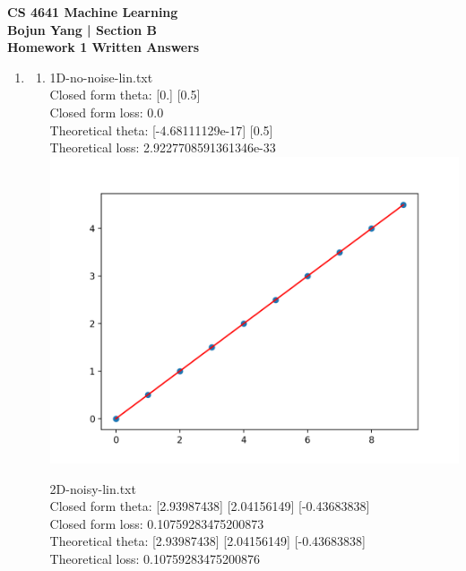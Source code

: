 \documentclass[12pt]{article}
\newcommand{\nextproblem}{
	\vfill
	\pagebreak
}
\begin{document}
	\begin{center}
			\textbf{CS 4641 Machine Learning} \vspace*{2mm}
			\textbf{\\ Bojun Yang | Section B} \vspace*{2mm}
			\textbf{\\ Homework 1 Written Answers }
	\end{center}
	\vspace*{2mm}


\begin{enumerate}

\item
\begin{enumerate}
	\item 1D-no-noise-lin.txt
	\\ Closed form theta: [0.] [0.5]
	\\ Closed form loss: 0.0
	\\ Theoretical theta: [-4.68111129e-17] [0.5]
	\\ Theoretical loss: 2.9227708591361346e-33 
	\\ \includegraphics[height=0.5\textheight]{closedForm1D}
	\nextproblem
	2D-noisy-lin.txt
	\\ Closed form theta: [2.93987438] [2.04156149] [-0.43683838]
	\\ Closed form loss: 0.10759283475200873
	\\ Theoretical theta: [2.93987438] [2.04156149] [-0.43683838]
	\\ Theoretical loss: 0.10759283475200876

\end{enumerate}
\end{enumerate}
\end{document}

